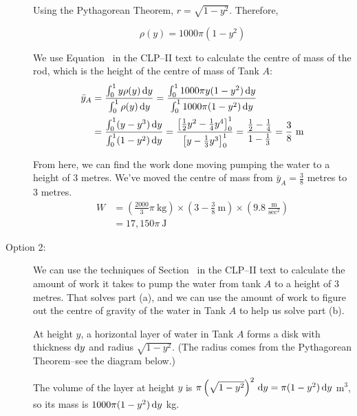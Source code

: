 \begin{solution}
\begin{description}
Using the Pythagorean Theorem, $r = \sqrt{1-y^2}$. Therefore,

\[\rho(y)= 1000\pi(1-y^2)\]

We use Equation~ in the CLP--II text to calculate the centre of mass of the rod, which is the height of the centre of mass of Tank $A$:
\begin{align*}
\bar y_A&=\frac{\int_0^1 y\rho(y)\,\mathrm{d}y}{\int_0^1 \rho(y)\,\mathrm{d}y} =
\frac{\int_0^1 1000\pi y(1-y^2)\,\mathrm{d}y}{\int_0^1 1000\pi(1-y^2)\,\mathrm{d}y}\\
&=\frac{\int_0^1(y-y^3)\,\mathrm{d}y}{\int_0^1(1-y^2)\,\mathrm{d}y} = \frac{\left[\frac{1}{2}y^2 - \frac{1}{4}y^4\right]_0^1}{\left[y-\frac{1}{3}y^3\right]_0^1} = \frac{\frac{1}{2}-\frac{1}{4}}{1-\frac{1}{3}}=\frac{3}{8}~\text{m}
\end{align*}

From here, we can find the work done moving pumping the water to a height of 3 metres. We've moved the centre of mass from $\bar y_A = \frac{3}{8}$ metres to 3 metres.
\begin{align*}
W&=\left(\frac{2000}{3}\pi~\text{kg}\right)\times\left(3 - \frac{3}{8}~\text{m}\right)\times\left(9.8 ~\frac{\text{m}}{\text{sec}^2}\right)\\
&=17,150\pi~\text{J}
\end{align*}
\item[Option 2:] We can use the techniques of Section~
 in the CLP--II text to calculate the amount of work it takes to pump the water from tank $A$ to a height of 3 metres. That solves part (a), and we can use the amount of work to figure out the centre of gravity of the water in Tank $A$ to help us solve part (b).

At height $y$, a horizontal layer of water in Tank $A$ forms a disk with thickness $\mathrm{d}y$ and radius $\sqrt{1-y^2}$. (The radius  comes from the Pythagorean Theorem--see  the diagram below.)

\begin{center}\end{center}

The volume of the layer at height $y$ is $\pi \left(\sqrt{1-y^2}\right)^2\,\mathrm{d}y = \pi(1-y^2)\,\mathrm{d}y$ m$^3$, so its mass is $1000\pi(1-y^2)\,\mathrm{d}y$ kg.


\end{description}
\end{solution}
